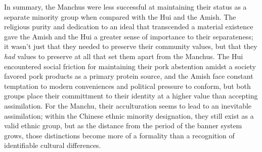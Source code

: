 In summary, the Manchus were less successful at maintaining their status as a
separate minority group when compared with the  Hui and the Amish. The religious
purity and dedication to an ideal that transcended a material existence gave the
Amish and the Hui a greater sense of importance to their separateness; it wasn't
just that they needed to preserve their community values, but that they
\textit{had} values to preserve at all that set them apart from the Manchus. The
Hui encountered social friction for maintaining their pork abstention amidst a
society favored pork products as a primary protein source, and the Amish face
constant temptation to modern conveniences and political pressure to conform,
but both groups place their committment to their identity at a higher value than
accepting assimilation. For the Manchu, their acculturation seems to lead to an
inevitable assimilation; within the Chinese ethnic minority designation, they
still exist as a valid ethnic group, but as the distance from the period of the
banner system grows, those distinctions become more of a formality than a
recognition of identifiable cultural differences.

